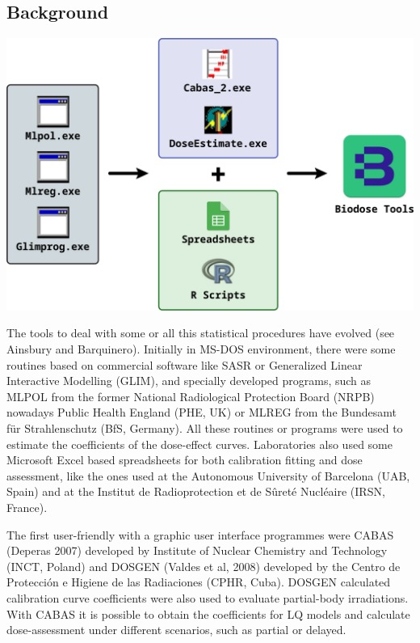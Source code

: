 \documentclass[]{scrartcl}
\begin{document}
\hypertarget{intro-background}{%
\subsection{Background}\label{intro-background}}

\begin{center}\includegraphics[width=0.75\linewidth]{images/intro/chronology} \end{center}

The tools to deal with some or all this statistical procedures have evolved (see Ainsbury and Barquinero). Initially in MS-DOS environment, there were some routines based on commercial software like SASR or Generalized Linear Interactive Modelling (GLIM), and specially developed programs, such as MLPOL from the former National Radiological Protection Board (NRPB) nowadays Public Health England (PHE, UK) or MLREG from the Bundesamt für Strahlenschutz (BfS, Germany). All these routines or programs were used to estimate the coefficients of the dose-effect curves. Laboratories also used some Microsoft Excel based spreadsheets for both calibration fitting and dose assessment, like the ones used at the Autonomous University of Barcelona (UAB, Spain) and at the Institut de Radioprotection et de Sûreté Nucléaire (IRSN, France).

The first user-friendly with a graphic user interface programmes were CABAS (Deperas 2007) developed by Institute of Nuclear Chemistry and Technology (INCT, Poland) and DOSGEN (Valdes et al, 2008) developed by the Centro de Protección e Higiene de las Radiaciones (CPHR, Cuba). DOSGEN calculated calibration curve coefficients were also used to evaluate partial-body irradiations. With CABAS it is possible to obtain the coefficients for LQ models and calculate dose-assessment under different scenarios, such as partial or delayed.
\end{document}
